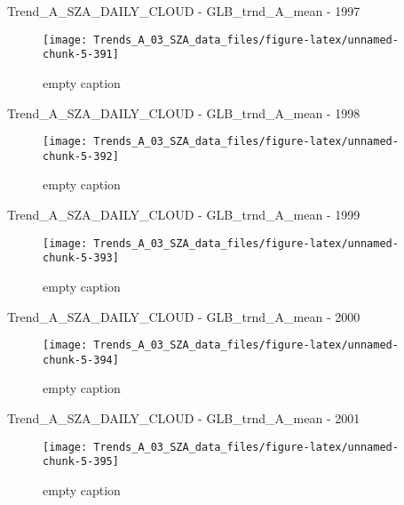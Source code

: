 \documentclass[
  10pt,
  a4paper,oneside]{article}
\begin{document}
Trend\_A\_SZA\_DAILY\_CLOUD - GLB\_trnd\_A\_mean - 1997

\begin{figure}[!ht]

{\centering \texttt{[image: Trends\_A\_03\_SZA\_data\_files/figure-latex/unnamed-chunk-5-391]} 

}

\caption{ empty caption }\label{fig:unnamed-chunk-5-391}
\end{figure}

Trend\_A\_SZA\_DAILY\_CLOUD - GLB\_trnd\_A\_mean - 1998

\begin{figure}[!ht]

{\centering \texttt{[image: Trends\_A\_03\_SZA\_data\_files/figure-latex/unnamed-chunk-5-392]} 

}

\caption{ empty caption }\label{fig:unnamed-chunk-5-392}
\end{figure}

Trend\_A\_SZA\_DAILY\_CLOUD - GLB\_trnd\_A\_mean - 1999

\begin{figure}[!ht]

{\centering \texttt{[image: Trends\_A\_03\_SZA\_data\_files/figure-latex/unnamed-chunk-5-393]} 

}

\caption{ empty caption }\label{fig:unnamed-chunk-5-393}
\end{figure}

Trend\_A\_SZA\_DAILY\_CLOUD - GLB\_trnd\_A\_mean - 2000

\begin{figure}[!ht]

{\centering \texttt{[image: Trends\_A\_03\_SZA\_data\_files/figure-latex/unnamed-chunk-5-394]} 

}

\caption{ empty caption }\label{fig:unnamed-chunk-5-394}
\end{figure}

Trend\_A\_SZA\_DAILY\_CLOUD - GLB\_trnd\_A\_mean - 2001

\begin{figure}[!ht]

{\centering \texttt{[image: Trends\_A\_03\_SZA\_data\_files/figure-latex/unnamed-chunk-5-395]} 

}

\caption{ empty caption }\label{fig:unnamed-chunk-5-395}
\end{figure}
\end{document}
